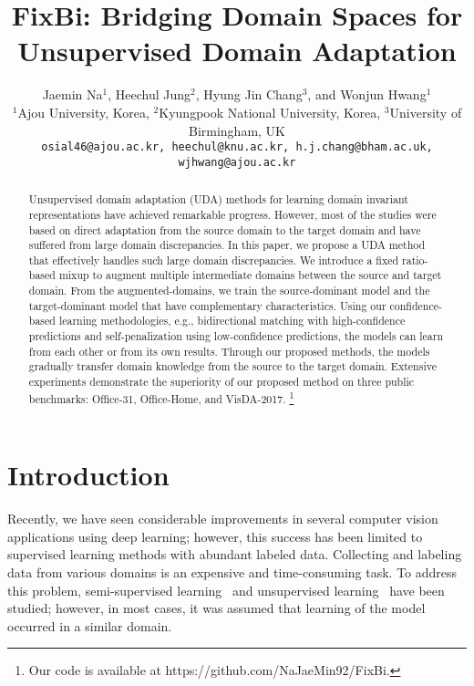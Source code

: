 \documentclass[final]{cvpr}
\begin{document}
\title{FixBi: Bridging Domain Spaces for Unsupervised Domain Adaptation}

\author{Jaemin Na$^1$, Heechul Jung$^2$, Hyung Jin Chang$^3$, and Wonjun Hwang$^1$\\
$^1$Ajou University, Korea, $^2$Kyungpook National University, Korea, $^3$University of Birmingham, UK\\
{\tt\small osial46@ajou.ac.kr, heechul@knu.ac.kr, h.j.chang@bham.ac.uk, wjhwang@ajou.ac.kr}
}

\maketitle


\begin{abstract}
Unsupervised domain adaptation (UDA) methods for learning domain invariant representations have achieved remarkable progress. However, most of the studies were based on direct adaptation from the source domain to the target domain and have suffered from large domain discrepancies. In this paper, we propose a UDA method that effectively handles such large domain discrepancies. We introduce a fixed ratio-based mixup to augment multiple intermediate domains between the source and target domain. From the augmented-domains, we train the source-dominant model and the target-dominant model that have complementary characteristics. Using our confidence-based learning methodologies, e.g., bidirectional matching with high-confidence predictions and self-penalization using low-confidence predictions, the models can learn from each other or from its own results. Through our proposed methods, the models gradually transfer domain knowledge from the source to the target domain. Extensive experiments demonstrate the superiority of our proposed method on three public benchmarks: Office-31, Office-Home, and VisDA-2017.
\footnote{
Our code is available at https://github.com/NaJaeMin92/FixBi.}
\end{abstract}

\section{Introduction}
Recently, we have seen considerable improvements in several computer vision applications using deep learning; however, this success has been limited to supervised learning methods with abundant labeled data. 
Collecting and labeling data from various domains is an expensive and time-consuming task. To address this problem, semi-supervised learning~\cite{S4L, MixMatch, FixMatch} and unsupervised learning~\cite{Gidaris2018} have been studied; however, in most cases, it was assumed that learning of the model occurred in a similar domain.
\end{document}
